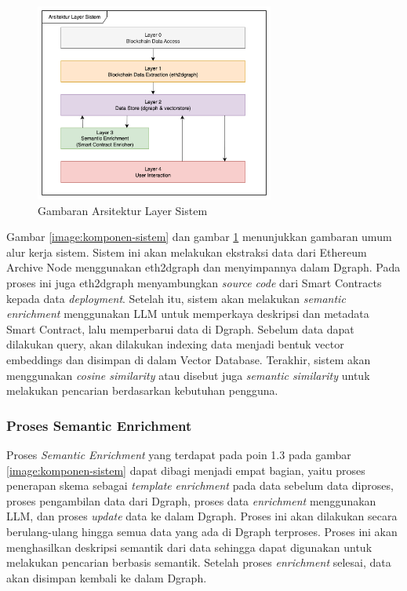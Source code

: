 \begin{figure}[ht]
	\centering
	\includegraphics[width=0.7\textwidth]{resources/chapter-3/layer-arsitektur-new.png}
	\caption{Gambaran Arsitektur Layer Sistem}
	\label{image:layer-arsitektur}
\end{figure}


Gambar \ref{image:komponen-sistem} dan gambar \ref{image:layer-arsitektur} menunjukkan gambaran umum alur kerja sistem. Sistem ini akan melakukan ekstraksi data dari Ethereum Archive Node menggunakan eth2dgraph dan menyimpannya dalam Dgraph. Pada proses ini juga eth2dgraph menyambungkan \textit{source code} dari Smart Contracts kepada data \textit{deployment}. Setelah itu, sistem akan melakukan \textit{semantic enrichment} menggunakan LLM untuk memperkaya deskripsi dan metadata Smart Contract, lalu memperbarui data di Dgraph. Sebelum data dapat dilakukan query, akan dilakukan indexing data menjadi bentuk vector embeddings dan disimpan di dalam Vector Database. Terakhir, sistem akan menggunakan \textit{cosine similarity} atau disebut juga \textit{semantic similarity} untuk melakukan pencarian berdasarkan kebutuhan pengguna.

\subsubsection{Proses Semantic Enrichment}

Proses \textit{Semantic Enrichment} yang terdapat pada poin 1.3 pada gambar \ref{image:komponen-sistem} dapat dibagi menjadi empat bagian, yaitu proses penerapan skema sebagai \textit{template} \textit{enrichment} pada data sebelum data diproses, proses pengambilan data dari Dgraph, proses data \textit{enrichment} menggunakan LLM, dan proses \textit{update} data ke dalam Dgraph.
Proses ini akan dilakukan secara berulang-ulang hingga semua data yang ada di Dgraph terproses. Proses ini akan menghasilkan deskripsi semantik dari data sehingga dapat digunakan untuk melakukan pencarian berbasis semantik. Setelah proses \textit{enrichment} selesai, data akan disimpan kembali ke dalam Dgraph.

